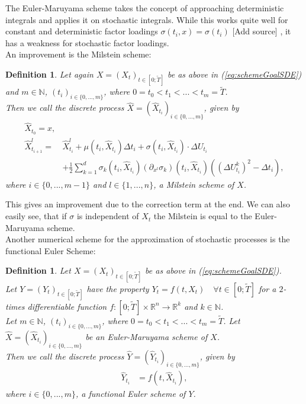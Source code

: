 \documentclass[12pt]{article}
\newtheorem{definition}[theorem]{Definition}
\begin{document}
	The Euler-Maruyama scheme takes the concept of approaching deterministic integrals and applies it on stochastic integrals. While this works quite well for constant and deterministic factor loadings $\sigma(t_i, x) = \sigma(t_i)$ \color{red}[Add source]\color{black} %
	, it has a weakness for stochastic factor loadings.\\
	An improvement is the Milstein scheme:
	\begin{definition}
		Let again $X=(X_t)_{t\in [0;\tilde{T}]}$ be as above in (\ref{eq:schemeGoalSDE}) and $m \in \mathbb{N}$, $(t_i)_{i\in \{0, ..., m\}}$, where $0=t_0 < t_1 < ... < t_m=\tilde{T}$.\\
		Then we call the discrete process $\hat{X} = (\hat{X}_{t_i})_{i \in \{0, ..., m\}}$, given by
		\begin{align*}
			\hat{X}_{t_0} = x,\\
			\hat{X}^l_{t_{i+1}} =& \hat{X}^l_{t_{i}} + \mu(t_i, \hat{X}_{t_{i}})\Delta t_i + \sigma(t_i, \hat{X}_{t_{i}}) \cdot \Delta U_{t_i}\\
			&+ \frac{1}{2}\sum_{k=1}^{d}\sigma_k(t_i, \hat{X}_{t_i})(\partial_{x^l}\sigma_k)(t_i, \hat{X}_{t_i})((\Delta U^k_{t_i})^2 - \Delta t_i),
		\end{align*}
		where $i \in \{0, ..., m-1\}$ and $l \in \{1, ..., n\}$, a \emph{Milstein scheme of $X$}.
	\end{definition}
	This gives an improvement due to the correction term at the end. We can also easily see, that if $\sigma$ is independent of $X_t$ the Milstein is equal to the Euler-Maruyama scheme.\\
	Another numerical scheme for the approximation of stochastic processes is the functional Euler Scheme:
	\begin{definition}
		Let $X=(X_t)_{t\in [0;\tilde{T}]}$ be as above in (\ref{eq:schemeGoalSDE}).\\
		Let $Y=(Y_t)_{t\in [0;\tilde{T}]}$ have the property $Y_t = f(t, X_t) \quad \forall t\in [0;\tilde{T}]$ for a $2$-times differentiable function $f: [0;\tilde{T}] \times \mathbb{R}^n \rightarrow \mathbb{R}^k$ and $k \in \mathbb{N}$.\\
		Let $m \in \mathbb{N}$, $(t_i)_{i\in \{0, ..., m\}}$, where $0=t_0 < t_1 < ... < t_m=\tilde{T}$. Let  $\hat{X} = (\hat{X}_{t_i})_{i \in \{0, ..., m\}}$ be an Euler-Maruyama scheme of $X$.\\
		Then we call the discrete process $\hat{Y} = (\hat{Y}_{t_i})_{i \in \{0, ..., m\}}$, given by
		\begin{align*}
			\hat{Y}_{t_i} &= f(t,\hat{X}_{t_i}),
		\end{align*}
		where $i \in \{0, ..., m\}$, a \emph{functional Euler scheme of $Y$}.
	\end{definition}
\end{document}
